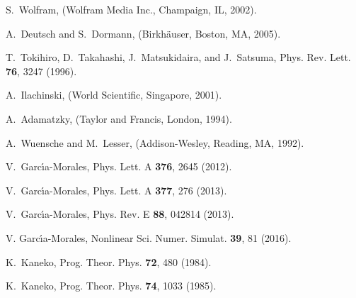 \documentclass[aps,pre,preprint,floatfix]{revtex4}
\theoremstyle{plain} \newtheorem{defi}{Definition}[section]
\theoremstyle{plain} \newtheorem{prop}{Proposition}[section]
\theoremstyle{plain} \newtheorem{theor}{Theorem}[section]
\theoremstyle{plain} \newtheorem{lemma}{Lemma}[section]
\theoremstyle{plain} \newtheorem*{corol}{Corollary}
\theoremstyle{remark} \newtheorem*{rem}{Remark}
\theoremstyle{plain} \newtheorem{exer}{Exercise}[section]
\theoremstyle{remark} \newtheorem*{ans}{Answer}
\begin{document}
\begin{thebibliography}{9}

S.~Wolfram,
 (Wolfram Media Inc., Champaign, IL,
  2002).

A.~Deutsch and S.~Dormann,
 (Birkh\"auser, Boston, MA,
  2005).

T.~Tokihiro, D.~Takahashi, J.~Matsukidaira, and J.~Satsuma,
\newblock Phys. Rev. Lett. {\bf 76}, 3247 (1996).


A.~Ilachinski,
 (World Scientific,
  Singapore, 2001).

A.~Adamatzky,
 (Taylor and Francis,
  London, 1994).


A.~Wuensche and M.~Lesser,
 (Addison-Wesley,
  Reading, MA, 1992).


V.~Garc{\'\i}a-Morales,
\newblock Phys. Lett. A {\bf 376}, 2645 (2012).

V.~Garc{\'\i}a-Morales,
\newblock Phys. Lett. A {\bf 377}, 276 (2013).

V.~Garc{\'\i}a-Morales,
\newblock Phys. Rev. E {\bf 88}, 042814 (2013).

V. Garc{\'\i}a-Morales,  Nonlinear Sci. Numer. Simulat. {\bf 39}, 81 (2016).

K.~Kaneko,
\newblock Prog. Theor. Phys. {\bf 72}, 480 (1984).

K.~Kaneko,
\newblock Prog. Theor. Phys. {\bf 74}, 1033 (1985).


\end{thebibliography}
\end{document}
